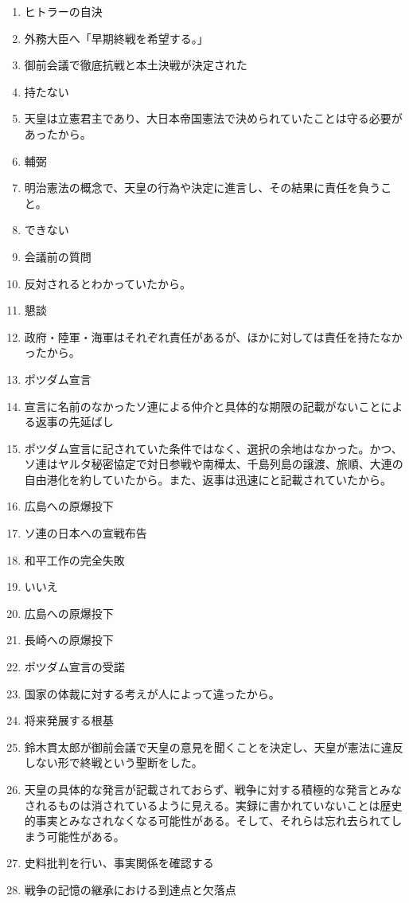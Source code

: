 \documentclass[]{jsarticle}
\begin{document}
\begin{enumerate}
	\item ヒトラーの自決
	\item 外務大臣へ「早期終戦を希望する。」
	\item 御前会議で徹底抗戦と本土決戦が決定された
	\item 持たない
	\item 天皇は立憲君主であり、大日本帝国憲法で決められていたことは守る必要があったから。
	\item 輔弼
	\item 明治憲法の概念で、天皇の行為や決定に進言し、その結果に責任を負うこと。
	\\
	\item できない
	\item 会議前の質問
	\item 反対されるとわかっていたから。
	\item 懇談
	\item 政府・陸軍・海軍はそれぞれ責任があるが、ほかに対しては責任を持たなかったから。
	\item ポツダム宣言
	\item 宣言に名前のなかったソ連による仲介と具体的な期限の記載がないことによる返事の先延ばし
	\item ポツダム宣言に記されていた条件ではなく、選択の余地はなかった。かつ、ソ連はヤルタ秘密協定で対日参戦や南樺太、千島列島の譲渡、旅順、大連の自由港化を約していたから。また、返事は迅速にと記載されていたから。
	\item 広島への原爆投下
	\item ソ連の日本への宣戦布告
	\item 和平工作の完全失敗
	\item いいえ
	\item 広島への原爆投下
	\item 長崎への原爆投下
	\item ポツダム宣言の受諾
	\item 国家の体裁に対する考えが人によって違ったから。
	\item 将来発展する根基
	\item 鈴木貫太郎が御前会議で天皇の意見を聞くことを決定し、天皇が憲法に違反しない形で終戦という聖断をした。
	\\
	\item 天皇の具体的な発言が記載されておらず、戦争に対する積極的な発言とみなされるものは消されているように見える。実録に書かれていないことは歴史的事実とみなされなくなる可能性がある。そして、それらは忘れ去られてしまう可能性がある。
	\item 史料批判を行い、事実関係を確認する
	\item 戦争の記憶の継承における到達点と欠落点
\end{enumerate}
\end{document}
